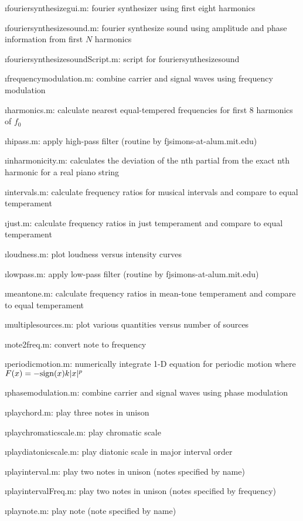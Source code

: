 \i fouriersynthesizegui.m:
fourier synthesizer using first eight harmonics

\i fouriersynthesizesound.m:
fourier synthesize sound using amplitude and phase information from first $N$ harmonics

\i fouriersynthesizesoundScript.m:
script for fouriersynthesizesound

\i frequencymodulation.m:
combine carrier and signal waves using frequency modulation

\i harmonics.m:
calculate nearest equal-tempered frequencies for first 8 harmonics of $f_0$

\i hipass.m:
apply high-pass filter
(routine by fjsimons-at-alum.mit.edu)

\i inharmonicity.m:
calculates the deviation of the nth partial from the exact nth harmonic for a 
real piano string

\i intervals.m:
calculate frequency ratios for musical intervals and compare to equal temperament

\i just.m:
calculate frequency ratios in just temperament and compare to equal temperament

\i loudness.m:
plot loudness versus intensity curves

\i lowpass.m:
apply low-pass filter
(routine by fjsimons-at-alum.mit.edu)

\i meantone.m:
calculate frequency ratios in mean-tone temperament and compare to equal temperament

\i multiplesources.m:
plot various quantities versus number of sources

\i note2freq.m:
convert note to frequency

\i periodicmotion.m:
numerically integrate 1-D equation for periodic motion 
where $F(x) = -{\rm sign}(x) k |x|^p$

\i phasemodulation.m:
combine carrier and signal waves using phase modulation

\i playchord.m:
play three notes in unison

\i playchromaticscale.m:
play chromatic scale

\i playdiatonicscale.m:
play diatonic scale in major interval order

\i playinterval.m:
play two notes in unison (notes specified by name)

\i playintervalFreq.m:
play two notes in unison (notes specified by frequency)

\i playnote.m:
play note (note specified by name)

